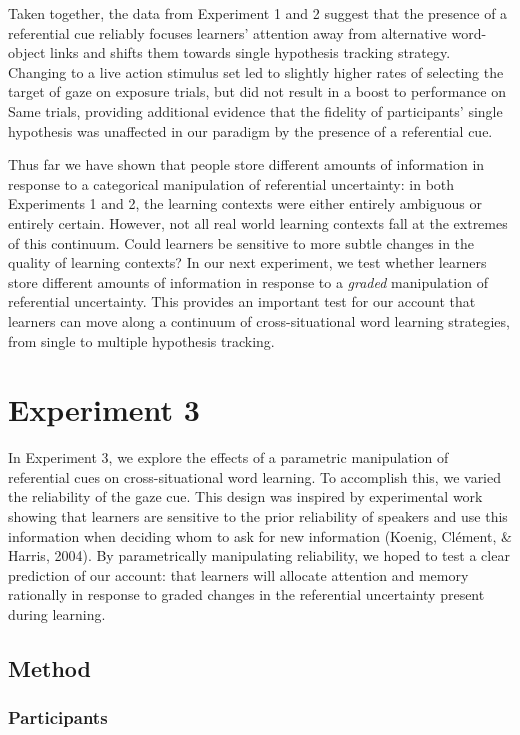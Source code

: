 \documentclass[12pt,]{article}
\begin{document}
Taken together, the data from Experiment 1 and 2 suggest that the
presence of a referential cue reliably focuses learners' attention away
from alternative word-object links and shifts them towards single
hypothesis tracking strategy. Changing to a live action stimulus set led
to slightly higher rates of selecting the target of gaze on exposure
trials, but did not result in a boost to performance on Same trials,
providing additional evidence that the fidelity of participants' single
hypothesis was unaffected in our paradigm by the presence of a
referential cue.

Thus far we have shown that people store different amounts of
information in response to a categorical manipulation of referential
uncertainty: in both Experiments 1 and 2, the learning contexts were
either entirely ambiguous or entirely certain. However, not all real
world learning contexts fall at the extremes of this continuum. Could
learners be sensitive to more subtle changes in the quality of learning
contexts? In our next experiment, we test whether learners store
different amounts of information in response to a \emph{graded}
manipulation of referential uncertainty. This provides an important test
for our account that learners can move along a continuum of
cross-situational word learning strategies, from single to multiple
hypothesis tracking.

\section{Experiment 3}\label{experiment-3}

In Experiment 3, we explore the effects of a parametric manipulation of
referential cues on cross-situational word learning. To accomplish this,
we varied the reliability of the gaze cue. This design was inspired by
experimental work showing that learners are sensitive to the prior
reliability of speakers and use this information when deciding whom to
ask for new information (Koenig, Cl{é}ment, \& Harris, 2004). By
parametrically manipulating reliability, we hoped to test a clear
prediction of our account: that learners will allocate attention and
memory rationally in response to graded changes in the referential
uncertainty present during learning.

\subsection{Method}\label{method-2}

\subsubsection{Participants}\label{participants-2}
\end{document}
